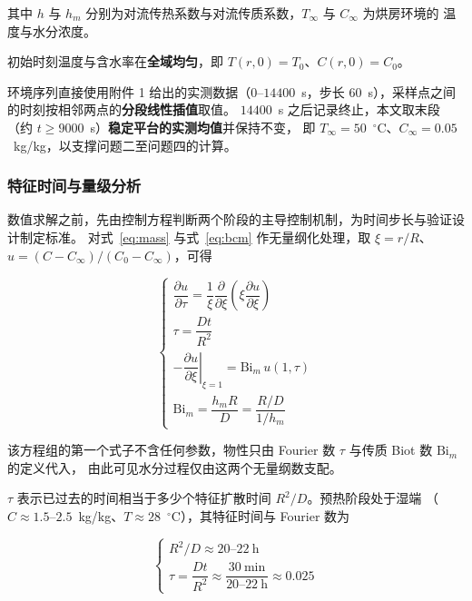 其中 $h$ 与 $h_m$ 分别为对流传热系数与对流传质系数，$T_\infty$ 与 $C_\infty$ 为烘房环境的
温度与水分浓度。


初始时刻温度与含水率在\textbf{全域均匀}，即 $T(r,0)=T_0$、$C(r,0)=C_0$。


环境序列直接使用附件 1 给出的实测数据（$0$--$14400$~s，步长 $60$~s），采样点之间的时刻按相邻两点的\textbf{分段线性插值}取值。
$14400$~s 之后记录终止，本文取末段（约 $t\ge9000$~s）\textbf{稳定平台的实测均值}并保持不变，
即 $T_\infty=50$~$^\circ$C、$C_\infty=0.05$~kg/kg，以支撑问题二至问题四的计算。

\subsubsection{特征时间与量级分析}


数值求解之前，先由控制方程判断两个阶段的主导控制机制，为时间步长与验证设计制定标准。
对式~\eqref{eq:mass} 与式~\eqref{eq:bcm} 作无量纲化处理，取 $\xi=r/R$、$u=(C-C_\infty)/(C_0-C_\infty)$，可得

\begin{equation}
\begin{cases}
\dfrac{\partial u}{\partial\tau}
=\dfrac{1}{\xi}\dfrac{\partial}{\partial\xi}\left(\xi\dfrac{\partial u}{\partial\xi}\right)\\[16pt]
\tau=\dfrac{Dt}{R^2}\\[16pt]
\left.-\dfrac{\partial u}{\partial\xi}\right|_{\xi=1}
=\text{Bi}_m\,u(1,\tau)\\[16pt]
\text{Bi}_m=\dfrac{h_mR}{D}=\dfrac{R/D}{1/h_m}
\end{cases}
\label{eq:massnd}
\end{equation}

该方程组的第一个式子不含任何参数，物性只由 Fourier 数 $\tau$ 与传质 Biot 数 $\text{Bi}_m$ 的定义代入，
由此可见水分过程仅由这两个无量纲数支配。


$\tau$ 表示已过去的时间相当于多少个特征扩散时间 $R^2/D$。预热阶段处于湿端
（$C\approx1.5$--$2.5$~kg/kg、$T\approx28$~$^\circ$C），其特征时间与 Fourier 数为

\[
\begin{cases}
R^2/D\approx20\text{--}22~\text{h}\\[16pt]
\tau=\dfrac{Dt}{R^2}\approx\dfrac{30~\text{min}}{20\text{--}22~\text{h}}\approx0.025
\end{cases}
\]

